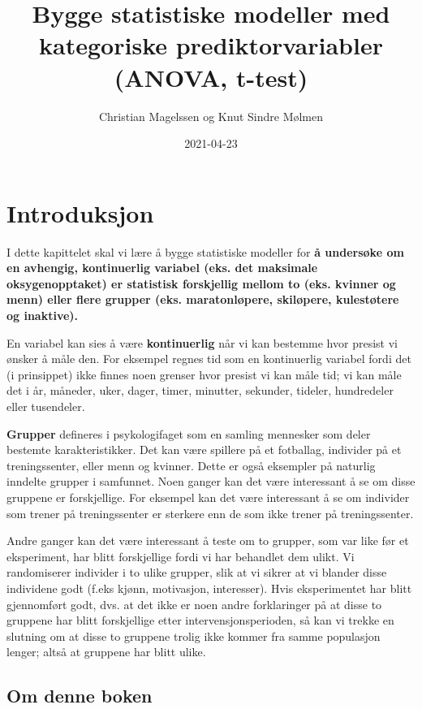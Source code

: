 \documentclass[
]{book}
\title{Bygge statistiske modeller med kategoriske prediktorvariabler (ANOVA, t-test)}
\author{Christian Magelssen og Knut Sindre Mølmen}
\date{2021-04-23}
\begin{document}
\maketitle

{
\setcounter{tocdepth}{1}
\tableofcontents
}
\hypertarget{intro}{%
\chapter{Introduksjon}\label{intro}}

I dette kapittelet skal vi lære å bygge statistiske modeller for \textbf{å undersøke om en avhengig, kontinuerlig variabel (eks. det maksimale oksygenopptaket) er statistisk forskjellig mellom to (eks. kvinner og menn) eller flere grupper (eks. maratonløpere, skiløpere, kulestøtere og inaktive).}

En variabel kan sies å være \textbf{kontinuerlig} når vi kan bestemme hvor presist vi ønsker å måle den. For eksempel regnes tid som en kontinuerlig variabel fordi det (i prinsippet) ikke finnes noen grenser hvor presist vi kan måle tid; vi kan måle det i år, måneder, uker, dager, timer, minutter, sekunder, tideler, hundredeler eller tusendeler.

\textbf{Grupper} defineres i psykologifaget som en samling mennesker som deler bestemte karakteristikker. Det kan være spillere på et fotballag, individer på et treningssenter, eller menn og kvinner. Dette er også eksempler på naturlig inndelte grupper i samfunnet. Noen ganger kan det være interessant å se om disse gruppene er forskjellige. For eksempel kan det være interessant å se om individer som trener på treningssenter er sterkere enn de som ikke trener på treningssenter.

Andre ganger kan det være interessant å teste om to grupper, som var like før et eksperiment, har blitt forskjellige fordi vi har behandlet dem ulikt. Vi randomiserer individer i to ulike grupper, slik at vi sikrer at vi blander disse individene godt (f.eks kjønn, motivasjon, interesser). Hvis eksperimentet har blitt gjennomført godt, dvs. at det ikke er noen andre forklaringer på at disse to gruppene har blitt forskjellige etter intervensjonsperioden, så kan vi trekke en slutning om at disse to gruppene trolig ikke kommer fra samme populasjon lenger; altså at gruppene har blitt ulike.

\hypertarget{om-denne-boken}{%
\section{Om denne boken}\label{om-denne-boken}}
\end{document}
